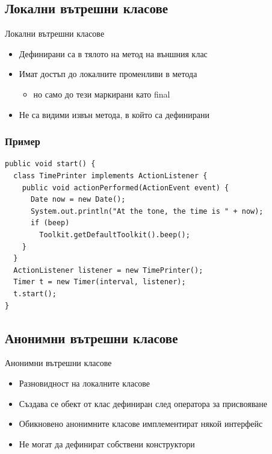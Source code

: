 \documentclass{beamer}
\begin{document}
\subsection{Локални вътрешни класове}
\begin{frame}{Локални вътрешни класове}
  
  \begin{itemize}
  \item Дефинирани са в тялото на метод на външния клас 
  \item Имат достъп до локалните променливи в метода 
    \begin{itemize}
      \item но само до тези маркирани като final 
    \end{itemize}
  \item Не са видими извън метода, в който са дефинирани
  \end{itemize}
\end{frame}

\begin{frame}[fragile]
  \frametitle{Пример}
  
\begin{lstlisting}[basicstyle=\small]
public void start() {
  class TimePrinter implements ActionListener {
    public void actionPerformed(ActionEvent event) {
      Date now = new Date();
      System.out.println("At the tone, the time is " + now);
      if (beep) 
        Toolkit.getDefaultToolkit().beep();
    }
  }
  ActionListener listener = new TimePrinter();
  Timer t = new Timer(interval, listener);
  t.start();
}  
\end{lstlisting}
\end{frame}

\subsection{Анонимни вътрешни класове}
\begin{frame}{Анонимни вътрешни класове}
  
  \begin{itemize}
  \item Разновидност на локалните класове 
  \item Създава се обект от клас дефиниран след оператора за
    присвояване 
  \item Обикновено анонимните класове имплементират някой интерфейс
    
  \item Не могат да дефинират собствени конструктори
  \end{itemize}
\end{frame}
\end{document}
